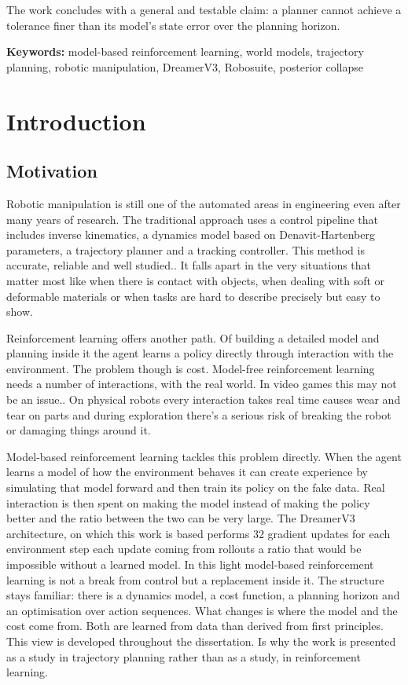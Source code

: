 \documentclass[12pt,a4paper,oneside]{report}
\begin{document}
The work concludes with a general and testable claim: a planner cannot achieve a
tolerance finer than its model's state error over the planning horizon.

\textbf{Keywords:} model-based reinforcement learning, world models, trajectory
planning, robotic manipulation, DreamerV3, Robosuite, posterior collapse

\newpage

\hypertarget{introduction}{%
\chapter{Introduction}\label{introduction}}

\hypertarget{motivation}{%
\section{Motivation}\label{motivation}}

Robotic manipulation is still one of the automated areas in engineering even after many years of research. The traditional approach uses a control pipeline that includes inverse kinematics, a dynamics model based on Denavit-Hartenberg parameters, a trajectory planner and a tracking controller. This method is accurate, reliable and well studied.. It falls apart in the very situations that matter most like when there is contact with objects, when dealing with soft or deformable materials or when tasks are hard to describe precisely but easy to show.

Reinforcement learning offers another path. Of building a detailed model and planning inside it the agent learns a policy directly through interaction with the environment. The problem though is cost. Model-free reinforcement learning needs a number of interactions, with the real world. In video games this may not be an issue.. On physical robots every interaction takes real time causes wear and tear on parts and during exploration there’s a serious risk of breaking the robot or damaging things around it.

Model‑based reinforcement learning tackles this problem directly. When the agent learns a model of how the environment behaves it can create experience by simulating that model forward and then train its policy on the fake data. Real interaction is then spent on making the model instead of making the policy better and the ratio between the two can be very large. The DreamerV3 architecture, on which this work is based performs 32 gradient updates for each environment step each update coming from rollouts a ratio that would be impossible without a learned model. In this light model‑based reinforcement learning is not a break from control but a replacement inside it. The structure stays familiar: there is a dynamics model, a cost function, a planning horizon and an optimisation over action sequences. What changes is where the model and the cost come from. Both are learned from data than derived from first principles. This view is developed throughout the dissertation. Is why the work is presented as a study in trajectory planning rather than as a study, in reinforcement learning.
\end{document}
